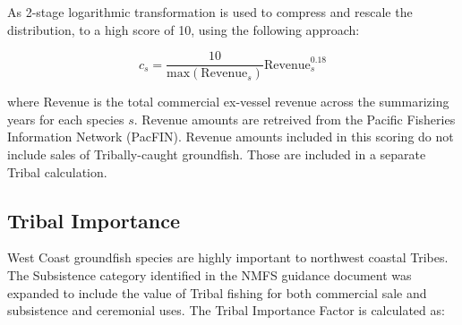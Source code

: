 \documentclass[11pt,
  english,
  a4paper,
]{article}
\begin{document}
\leavevmode\tagmcend\tagstructend\par


As 2-stage logarithmic transformation is used to compress and rescale the distribution, to a high score of 10, using the following approach:

\leavevmode\tagmcend\tagstructend\par


\begin{equation}
  c_{s} = \frac{10}{\text{max}(\text{Revenue}_s)}\text{Revenue}_s^{0.18} 
\end{equation}

\leavevmode\tagmcend\tagstructend\par


where Revenue is the total commercial ex-vessel revenue across the summarizing years for each species {\(s\)\leavevmode\tagmcend\tagstructend}. Revenue amounts are retreived from the Pacific Fisheries Information Network (PacFIN). Revenue amounts included in this scoring do not include sales of Tribally-caught groundfish. Those are included in a separate Tribal calculation.

\leavevmode\tagmcend\tagstructend\par


\hypertarget{tribal-importance}{%
\subsection{Tribal Importance}\label{tribal-importance}}

\leavevmode\tagmcend\tagstructend


West Coast groundfish species are highly important to northwest coastal Tribes. The Subsistence category identified in the NMFS guidance document was expanded to include the value of Tribal fishing for both commercial sale and subsistence and ceremonial uses. The Tribal Importance Factor is calculated as:

\leavevmode\tagmcend\tagstructend\par
\end{document}
